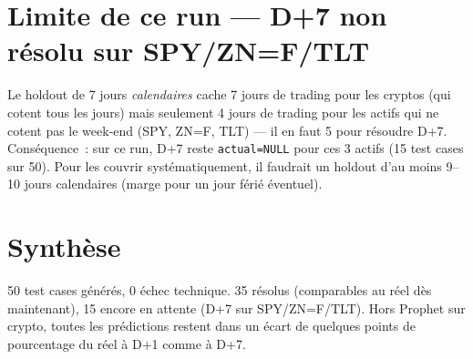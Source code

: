 \documentclass[11pt]{article}
\begin{document}
\section{Limite de ce run --- D+7 non r\'esolu sur SPY/ZN=F/TLT}
\label{sec:limite}

Le holdout de 7 jours \emph{calendaires} cache 7 jours de trading pour les
cryptos (qui cotent tous les jours) mais seulement 4 jours de trading pour les
actifs qui ne cotent pas le week-end (SPY, ZN=F, TLT) --- il en faut 5 pour
r\'esoudre D+7. Cons\'equence~: sur ce run, D+7 reste \texttt{actual=NULL} pour
ces 3 actifs (15 test cases sur 50). Pour les couvrir syst\'ematiquement, il
faudrait un holdout d'au moins 9--10 jours calendaires (marge pour un jour
f\'eri\'e \'eventuel).

\section{Synth\`ese}

50 test cases g\'en\'er\'es, 0 \'echec technique. 35 r\'esolus (comparables au
r\'eel d\`es maintenant), 15 encore en attente (D+7 sur SPY/ZN=F/TLT). Hors
Prophet sur crypto, toutes les pr\'edictions restent dans un \'ecart de
quelques points de pourcentage du r\'eel \`a D+1 comme \`a D+7.
\end{document}
